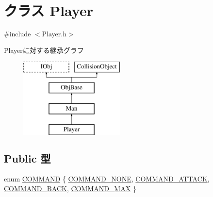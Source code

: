 \hypertarget{class_player}{\section{クラス Player}
\label{class_player}
}


{\ttfamily \#include $<$Player.\-h$>$}

Playerに対する継承グラフ\begin{figure}[H]
\begin{center}
\leavevmode
\includegraphics[height=4.000000cm]{d8/d53/class_player}
\end{center}
\end{figure}
\subsection*{Public 型}
\begin{DoxyCompactItemize}
\item 
enum \hyperlink{class_player_a70057174eaea9fd441ca86cc7bb896ed}{C\-O\-M\-M\-A\-N\-D} \{ \hyperlink{class_player_a70057174eaea9fd441ca86cc7bb896eda7e2bd6a5ce792a4b5c0b49577306c13b}{C\-O\-M\-M\-A\-N\-D\-\_\-\-N\-O\-N\-E}, 
\hyperlink{class_player_a70057174eaea9fd441ca86cc7bb896eda88afd12ac0813020208065d8d4ab6b9f}{C\-O\-M\-M\-A\-N\-D\-\_\-\-A\-T\-T\-A\-C\-K}, 
\hyperlink{class_player_a70057174eaea9fd441ca86cc7bb896edadd2b613c7910904d0750063d5a35a0a9}{C\-O\-M\-M\-A\-N\-D\-\_\-\-B\-A\-C\-K}, 
\hyperlink{class_player_a70057174eaea9fd441ca86cc7bb896edad01c32d56480ffb6d78c1bc6a1672e1b}{C\-O\-M\-M\-A\-N\-D\-\_\-\-M\-A\-X}
 \}
\end{DoxyCompactItemize}
